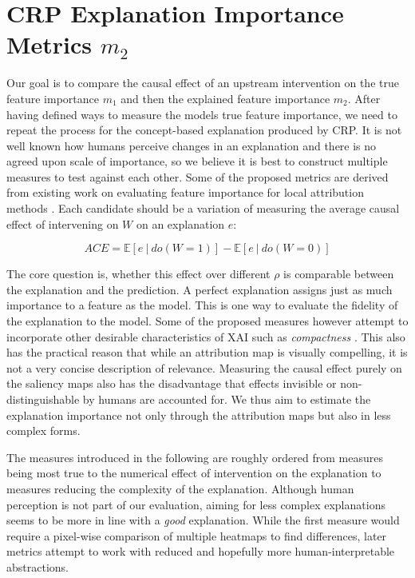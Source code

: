 
\section{CRP Explanation Importance Metrics $m_2$}\label{section:measure}
Our goal is to compare the causal effect of an upstream intervention on the true feature importance $m_1$ and then the explained feature importance $m_2$. After having defined ways to measure the models true feature importance, we need to repeat the process for the concept-based explanation produced by CRP. It is not well known how humans perceive changes in an explanation and there is no agreed upon scale of importance, so we believe it is best to construct multiple measures to test against each other. Some of the proposed metrics are derived from existing work on evaluating feature importance for local attribution methods \citep{Sixt2020, Karimi2023, Arras2022}. Each candidate should be a variation of measuring the average causal effect of intervening on $W$ on an explanation $e$:
\begin{center}
\begin{equation}
\displaystyle ACE = \mathbb{E} [e \ | \ do(W=1) ] - \mathbb{E} [ e \ | \ do(W=0) ]
\end{equation}
\end{center}

The core question is, whether this effect over different $\rho$ is comparable between the explanation and the prediction. A perfect explanation assigns just as much importance to a feature as the model. This is one way to evaluate the fidelity of the explanation to the model. Some of the proposed measures however attempt to incorporate other desirable characteristics of XAI such as \textit{compactness} \citep{Nauta2023}. This also has the practical reason that while an attribution map is visually compelling, it is not a very concise description of relevance. Measuring the causal effect purely on the saliency maps also has the disadvantage that effects invisible or non-distinguishable by humans are accounted for. 
We thus aim to estimate the explanation importance not only through the attribution maps but also in less complex forms. 

The measures introduced in the following are roughly ordered from measures being most true to the numerical effect of intervention on the explanation to measures reducing the complexity of the explanation. Although human perception is not part of our evaluation, aiming for less complex explanations seems to be more in line with a \textit{good} explanation. While the first measure would require a pixel-wise comparison of multiple heatmaps to find differences, later metrics attempt to work with reduced and hopefully more human-interpretable abstractions. 

